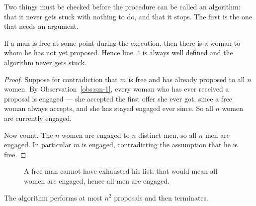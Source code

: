Two things must be checked before the procedure can be called an algorithm:
that it never gets stuck with nothing to do, and that it stops. The first is
the one that needs an argument.

\begin{lemma}\label{lem:sm-notstuck}
If a man is free at some point during the execution, then there is a woman to
whom he has not yet proposed. Hence line~4 is always well defined and the
algorithm never gets stuck.
\end{lemma}

\begin{proof}
Suppose for contradiction that $m$ is free and has already proposed to all $n$
women. By Observation~\ref{obs:sm-1}, every woman who has ever received a
proposal is engaged --- she accepted the first offer she ever got, since a
free woman always accepts, and she has stayed engaged ever since. So all $n$
women are currently engaged.

Now count. The $n$ women are engaged to $n$ distinct men, so all $n$ men are
engaged. In particular $m$ is engaged, contradicting the assumption that he is
free.
\end{proof}

\begin{figure}[ht]
\centering
{}
\caption{A free man cannot have exhausted his list: that would mean all women
are engaged, hence all men are engaged.}
\label{fig:sm-counting}
\end{figure}

\begin{lemma}\label{lem:sm-steps}
The algorithm performs at most $n^2$ proposals and then terminates.
\end{lemma}

